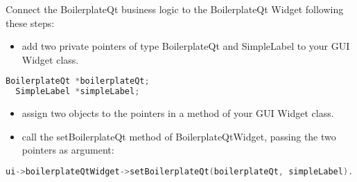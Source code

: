 Connect the BoilerplateQt business logic to the BoilerplateQt Widget following these steps:

\begin{itemize}
  \tightlist
  \item
        add two private pointers of type BoilerplateQt and SimpleLabel to your
        GUI Widget class.
\end{itemize}

\begin{lstlisting}[language=c++, gobble=2]
  BoilerplateQt *boilerplateQt;
  SimpleLabel *simpleLabel;
\end{lstlisting}

\begin{itemize}
  \tightlist
  \item
        assign two objects to the pointers in a method of your GUI Widget
        class.
  \item
        call the setBoilerplateQt method of BoilerplateQtWidget, passing the
        two pointers as argument:
\end{itemize}

\begin{lstlisting}[language=c++, gobble=2]
  ui->boilerplateQtWidget->setBoilerplateQt(boilerplateQt, simpleLabel).
\end{lstlisting}
